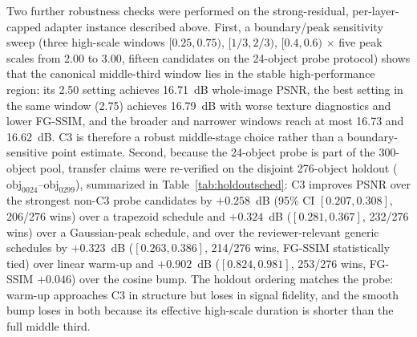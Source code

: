 \documentclass[times,twocolumn,final]{elsarticle}
\providecommand{\DIFadd}[1]{{\protect\color{blue} \sf #1}} %
\begin{document}
\DIFadd{Two further robustness checks were performed on the strong-residual, per-layer-capped adapter instance described above. First, a boundary/peak sensitivity sweep (three high-scale windows $[0.25,0.75)$, $[1/3,2/3)$, $[0.4,0.6)$ $\times$ five peak scales from 2.00 to 3.00, fifteen candidates on the 24-object probe protocol) shows that the canonical middle-third window lies in the stable high-performance region: its 2.50 setting achieves 16.71~dB whole-image PSNR, the best setting in the same window (2.75) achieves 16.79~dB with worse texture diagnostics and lower FG-SSIM, and the broader and narrower windows reach at most 16.73 and 16.62~dB. C3 is therefore a robust middle-stage choice rather than a boundary-sensitive point estimate. Second, because the 24-object probe is part of the 300-object pool, transfer claims were re-verified on the disjoint 276-object holdout ($\mathrm{obj}_{0024}$--$\mathrm{obj}_{0299}$), summarized in Table~\ref{tab:holdoutsched}: C3 improves PSNR over the strongest non-C3 probe candidates by $+0.258$~dB (95\% CI $[0.207,0.308]$, 206/276 wins) over a trapezoid schedule and $+0.324$~dB ($[0.281,0.367]$, 232/276 wins) over a Gaussian-peak schedule, and over the reviewer-relevant generic schedules by $+0.323$~dB ($[0.263,0.386]$, 214/276 wins, FG-SSIM statistically tied) over linear warm-up and $+0.902$~dB ($[0.824,0.981]$, 253/276 wins, FG-SSIM $+0.046$) over the cosine bump. The holdout ordering matches the probe: warm-up approaches C3 in structure but loses in signal fidelity, and the smooth bump loses in both because its effective high-scale duration is shorter than the full middle third.
}
\end{document}
